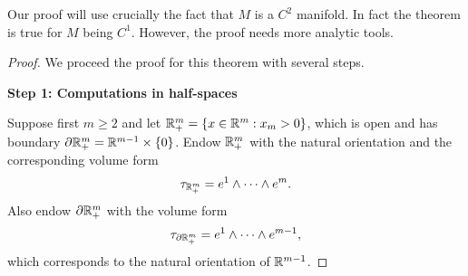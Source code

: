 \documentclass[a4paper]{article}
\begin{document}
\begin{remark}
  Our proof will use crucially the fact that $M$ is a $C^2$ manifold. In
  fact the theorem is true for $M$ being $C^1$. However, the proof needs
  more analytic tools.
\end{remark}

\begin{proof}
  We proceed the proof for this theorem with several steps.

  \textbf{Step 1: Computations in half-spaces}

  Suppose first $m \geq 2$ and let $\mathbb{R}^m_+ = \{x \in \mathbb{R}^m : x_m > 0\}$,
  which is open and has boundary $\partial \mathbb{R}^m_+ = \mathbb{R}^{m-1} \times \{0\}$.
  Endow $\mathbb{R}^m_+$ with the natural orientation and the corresponding volume
  form
  \[
    \tau_{\mathbb{R}^m_+} = e^1 \wedge \dots \wedge e^m.
  \]
  Also endow $\partial \mathbb{R}^m_+$ with the volume form
  \[
    \tau_{\partial \mathbb{R}^m_+} = e^1 \wedge \dots \wedge e^{m-1},
  \]
  which corresponds to the natural orientation of $\mathbb{R}^{m-1}$.


\end{proof}
\end{document}
